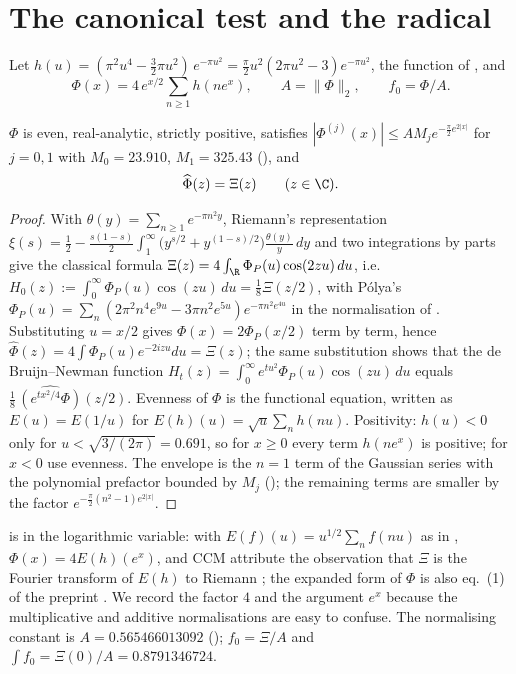 \section{The canonical test and the radical}\label{sec:canonical}

\begin{definition}\label{def:f0}
Let $h(u)=(\pi^2u^4-\tfrac32\pi u^2)\,e^{-\pi u^2}=\tfrac\pi2u^2(2\pi u^2-3)e^{-\pi u^2}$, the function of
\cite[(7.1)]{CCM-ZST-2025}, and
\begin{equation}\label{eq:Phi}
 \Phi(x)=4\,e^{x/2}\sum_{n\ge1}h(ne^{x}),\qquad A=\|\Phi\|_2,\qquad f_0=\Phi/A .
\end{equation}
\end{definition}

\begin{theorem}\label{thm:FPhi}
$\Phi$ is even, real-analytic, strictly positive, satisfies $|\Phi^{(j)}(x)|\le AM_je^{-\frac{\pi}{2}e^{2|x|}}$ for
$j=0,1$ with $M_0=23.910$, $M_1=325.43$ (), and
\[
 \widehat\Phi(z)=\Xi(z)\qquad(z\in\C).
\]
\end{theorem}
\begin{proof}
With $\theta(y)=\sum_{n\ge1}e^{-\pi n^2y}$, Riemann's representation
$\xi(s)=\tfrac12-\tfrac{s(1-s)}{2}\int_1^\infty\bigl(y^{s/2}+y^{(1-s)/2}\bigr)\frac{\theta(y)}{y}\,dy$
and two integrations by parts give the classical formula $\Xi(z)=4\int_{\R}\Phi_P(u)\cos(2zu)\,du$, i.e.\
$H_0(z):=\int_0^\infty\Phi_P(u)\cos(zu)\,du=\tfrac18\Xi(z/2)$, with P\'olya's
$\Phi_P(u)=\sum_n(2\pi^2n^4e^{9u}-3\pi n^2e^{5u})e^{-\pi n^2e^{4u}}$ in the normalisation of \cite{RodgersTao2018,Polymath15}.
Substituting $u=x/2$ gives $\Phi(x)=2\Phi_P(x/2)$ term by term, hence $\widehat\Phi(z)=4\int\Phi_P(u)e^{-2izu}du=\Xi(z)$; the same
substitution shows that the de Bruijn--Newman function $H_t(z)=\int_0^\infty e^{tu^2}\Phi_P(u)\cos(zu)\,du$ equals
$\tfrac18\,\widehat{(e^{tx^2/4}\Phi)}(z/2)$. Evenness of $\Phi$ is the functional equation, written as $E(u)=E(1/u)$ for
$E(h)(u)=\sqrt u\sum_nh(nu)$. Positivity: $h(u)<0$ only for $u<\sqrt{3/(2\pi)}=0.691$, so for $x\ge0$ every term $h(ne^x)$ is positive;
for $x<0$ use evenness. The envelope is the $n=1$ term of the Gaussian series with the polynomial prefactor bounded by $M_j$
(\Cref{app:constants}); the remaining terms are smaller by the factor $e^{-\frac\pi2(n^2-1)e^{2|x|}}$.
\end{proof}

 is \cite[Lemma 7.1]{CCM-ZST-2025} in the logarithmic variable: with $E(f)(u)=u^{1/2}\sum_nf(nu)$ as in
\cite[(7.2)]{CCM-ZST-2025}, $\Phi(x)=4E(h)(e^x)$, and CCM attribute the observation that $\Xi$ is the Fourier transform of $E(h)$ to
Riemann \cite{Riemann1859}; the expanded form of $\Phi$ is also eq.~(1) of the preprint \cite{Freedman2026}. We record the factor $4$ and the
argument $e^{x}$ because the multiplicative and additive normalisations are easy to confuse. The normalising constant is
$A=0.565466013092$ (\Cref{app:constants}); $\widehat{f_0}=\Xi/A$ and $\int f_0=\Xi(0)/A=0.8791346724$.

